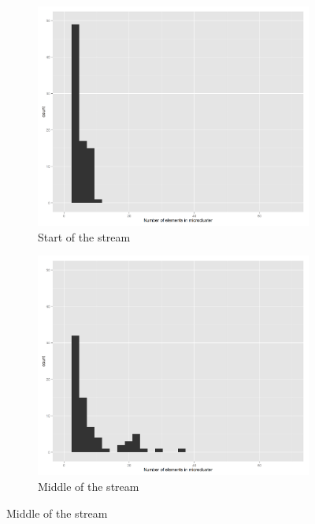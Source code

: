 \begin{figure}[h!]
  \centering
  \begin{subfigure}{0.32\textwidth}
    \centering
    \includegraphics[width = \textwidth]{microcluster_histograms/s_set_1_hist_microclusters_time_501_fixed.png}
    \caption{Start of the stream}
  \label{fig:hist1}
  \end{subfigure}
  \begin{subfigure}{0.32\textwidth}
    \centering
    \includegraphics[width = \textwidth]{microcluster_histograms/s_set_1_hist_microclusters_time_1250_fixed.png}
  \caption{Middle of the stream}

\end{subfigure}
\end{figure}
